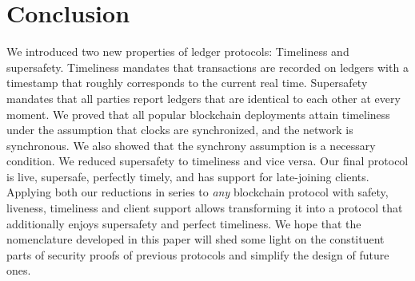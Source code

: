\section{Conclusion}

We introduced two new properties of ledger protocols:
Timeliness and supersafety. Timeliness mandates that transactions are
recorded on ledgers with a timestamp that roughly corresponds to the
current real time. Supersafety mandates that all parties
report ledgers that are identical to each other at every moment.
We proved that all popular blockchain
deployments attain timeliness under the assumption
that clocks are synchronized, and the network is synchronous.
We also showed that the synchrony assumption is a necessary condition.
We reduced supersafety to timeliness and
vice versa.
Our final protocol is live, supersafe, perfectly timely,
and has support for late-joining clients. Applying both our reductions
in series to \emph{any} blockchain protocol with safety, liveness, timeliness and client support
allows transforming it into a protocol that additionally enjoys supersafety and perfect timeliness.
We hope that the nomenclature developed in this paper will shed some light on the constituent parts
of security proofs of previous protocols and simplify the design of
future ones.